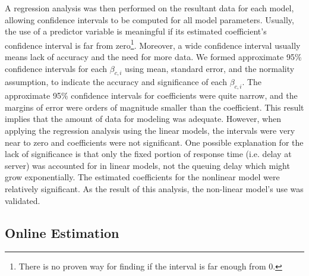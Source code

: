A regression analysis was then performed on the resultant data for each model, allowing confidence intervals to be computed for all model parameters.
Usually, the use of a predictor variable is meaningful if its estimated coefficient's confidence interval is far from zero\footnote{There is no proven way for finding if the interval is far enough from 0.}. Moreover, a wide confidence interval usually means lack of accuracy and the need for more data. We formed approximate 95\% confidence intervals for each $\beta_{c,i}$ using mean, standard error, and the normality assumption, to indicate the accuracy and significance of each $\beta_{c,i}$. 
The approximate 95\% confidence intervals for coefficients were quite narrow, and the margins of error were orders of magnitude smaller than the coefficient. This result implies that the amount of data for modeling was adequate.
However, when applying the regression analysis using the linear models, the intervals were very near to zero and coefficients were not significant.
One possible explanation for the lack of significance is that only the fixed portion of response time (i.e. delay at server) was accounted for in linear models, not the queuing delay which might grow exponentially. 
 The estimated coefficients for the nonlinear model were relatively significant.
As the result of this analysis, the non-linear model's use was validated. 




% 
\subsection{Online Estimation}
\label{sec:online-model-estimation}

